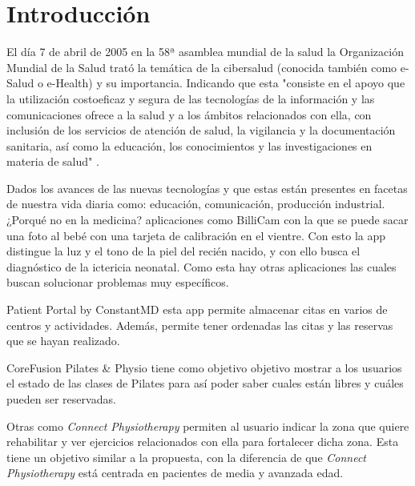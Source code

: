 \section{Introducción}
El día 7 de abril de 2005 en la 58ª asamblea mundial de la salud la Organización Mundial
de la Salud \cite{OMS} trató la temática de la cibersalud (conocida también como e-Salud
o e-Health) y su importancia. Indicando que esta "consiste en el apoyo que
la utilización costoeficaz y segura de las tecnologías de la información y las comunicaciones
ofrece a la salud y a los ámbitos relacionados con ella, con inclusión de los servicios de
atención de salud, la vigilancia y la documentación sanitaria, así como la educación, los
conocimientos y las investigaciones en materia de salud" \cite{58-asamblea}.

Dados los avances de las nuevas tecnologías y que estas están presentes en facetas de
nuestra vida diaria como: educación, comunicación, producción industrial. ¿Porqué no
en la medicina? aplicaciones como
BilliCam \cite{BilliCam} con la que se puede sacar una foto al bebé con una tarjeta de
calibración en el vientre. Con esto la app distingue la luz y el tono de la piel del recién
nacido, y con ello busca el diagnóstico de la ictericia neonatal. Como esta hay otras
aplicaciones las cuales buscan solucionar problemas muy específicos.

\medskip
Patient Portal by ConstantMD \cite{patient-portal} esta app permite  almacenar citas
en varios de centros y actividades. Además, permite tener ordenadas las citas y las
reservas que se hayan realizado.

\medskip
CoreFusion Pilates & Physio \cite{coreFusion} tiene como objetivo objetivo mostrar a
los usuarios el estado de las clases de Pilates para así poder saber cuales están
libres y cuáles pueden ser reservadas.

\medskip
Otras como \textit{Connect Physiotherapy} \cite{Connect-Physiotherapy} permiten al usuario
indicar la zona que quiere rehabilitar y ver ejercicios relacionados con ella para fortalecer
dicha zona. Esta tiene un objetivo similar a la propuesta, con la diferencia de que
\textit{Connect Physiotherapy} está centrada en pacientes de media y avanzada edad.

